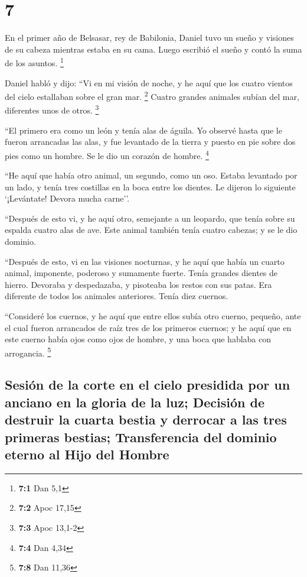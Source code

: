 \hypertarget{section-6}{%
\section{7}\label{section-6}}

 En el primer año de Belsasar, rey de Babilonia, Daniel
tuvo un sueño y visiones de su cabeza mientras estaba en su cama. Luego
escribió el sueño y contó la suma de los asuntos. \footnote{\textbf{7:1}
  Dan 5,1}

 Daniel habló y dijo: ``Vi en mi visión de noche, y he
aquí que los cuatro vientos del cielo estallaban sobre el gran mar.
\footnote{\textbf{7:2} Apoc 17,15}  Cuatro grandes
animales subían del mar, diferentes unos de otros. \footnote{\textbf{7:3}
  Apoc 13,1-2}

 ``El primero era como un león y tenía alas de águila. Yo
observé hasta que le fueron arrancadas las alas, y fue levantado de la
tierra y puesto en pie sobre dos pies como un hombre. Se le dio un
corazón de hombre. \footnote{\textbf{7:4} Dan 4,34}

 ``He aquí que había otro animal, un segundo, como un oso.
Estaba levantado por un lado, y tenía tres costillas en la boca entre
los dientes. Le dijeron lo siguiente `¡Levántate! Devora mucha carne''.

 ``Después de esto vi, y he aquí otro, semejante a un
leopardo, que tenía sobre su espalda cuatro alas de ave. Este animal
también tenía cuatro cabezas; y se le dio dominio.

 ``Después de esto, vi en las visiones nocturnas, y he
aquí que había un cuarto animal, imponente, poderoso y sumamente fuerte.
Tenía grandes dientes de hierro. Devoraba y despedazaba, y pisoteaba los
restos con sus patas. Era diferente de todos los animales anteriores.
Tenía diez cuernos.

 ``Consideré los cuernos, y he aquí que entre ellos subía
otro cuerno, pequeño, ante el cual fueron arrancados de raíz tres de los
primeros cuernos; y he aquí que en este cuerno había ojos como ojos de
hombre, y una boca que hablaba con arrogancia. \footnote{\textbf{7:8}
  Dan 11,36}

\hypertarget{sesiuxf3n-de-la-corte-en-el-cielo-presidida-por-un-anciano-en-la-gloria-de-la-luz-decisiuxf3n-de-destruir-la-cuarta-bestia-y-derrocar-a-las-tres-primeras-bestias-transferencia-del-dominio-eterno-al-hijo-del-hombre}{%
\subsection{Sesión de la corte en el cielo presidida por un anciano en
la gloria de la luz; Decisión de destruir la cuarta bestia y derrocar a
las tres primeras bestias; Transferencia del dominio eterno al Hijo del
Hombre}\label{sesiuxf3n-de-la-corte-en-el-cielo-presidida-por-un-anciano-en-la-gloria-de-la-luz-decisiuxf3n-de-destruir-la-cuarta-bestia-y-derrocar-a-las-tres-primeras-bestias-transferencia-del-dominio-eterno-al-hijo-del-hombre}}


